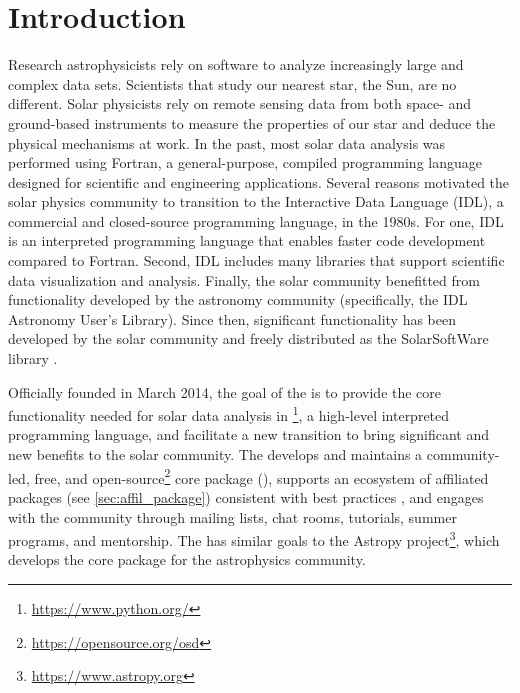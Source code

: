 \section{Introduction}
\label{sec:intro}

Research astrophysicists rely on software to analyze increasingly large and complex data sets.
Scientists that study our nearest star, the Sun, are no different.
Solar physicists rely on remote sensing data from both space- and ground-based instruments to measure the properties of our star and deduce the physical mechanisms at work.
In the past, most solar data analysis was performed using Fortran, a general-purpose, compiled programming language designed for scientific and engineering applications.
Several reasons motivated the solar physics community to transition to the Interactive Data Language (IDL), a commercial and closed-source programming language, in the 1980s.
For one, IDL is an interpreted programming language that enables faster code development compared to Fortran.
Second, IDL includes many libraries that support scientific data visualization and analysis.
Finally, the solar community benefitted from functionality developed by the astronomy community (specifically, the IDL Astronomy User's Library).
Since then, significant functionality has been developed by the solar community and freely distributed as the SolarSoftWare library \citep{Freeland:1998we}.

Officially founded in March 2014, the goal of the \sunpyproj is to provide the core functionality needed for solar data analysis in \python\footnote{\url{https://www.python.org/}}, a high-level interpreted programming language, and facilitate a new transition to bring significant and new benefits to the solar community.
The \sunpyproj develops and maintains a community-led, free, and open-source\footnote{\url{https://opensource.org/osd}} core \python package (\sunpypkg), supports an ecosystem of affiliated packages (see \autoref{sec:affil_package}) consistent with best practices \citep{Wilson:2014cka}, and engages with the community through mailing lists, chat rooms, tutorials, summer programs, and mentorship.
The \sunpyproj has similar goals to the Astropy project\footnote{\url{https://www.astropy.org}}, which develops the \astropypkg core package \citep{astropy2018} for the astrophysics community.

